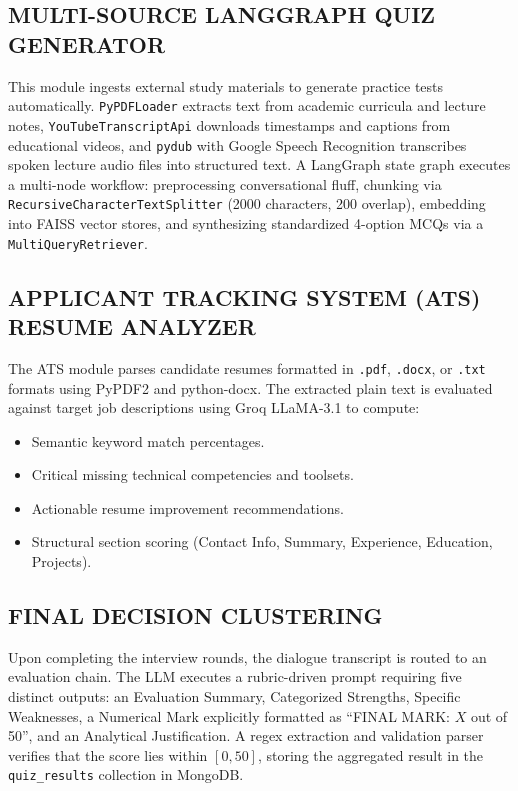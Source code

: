 \documentclass[12pt,a4paper]{report}
\begin{document}
\subsection{MULTI-SOURCE LANGGRAPH QUIZ GENERATOR}

This module ingests external study materials to generate practice tests automatically.
\texttt{PyPDFLoader} extracts text from academic curricula and lecture notes,
\texttt{YouTubeTranscriptApi} downloads timestamps and captions from educational
videos, and \texttt{pydub} with Google Speech Recognition transcribes spoken lecture
audio files into structured text. A LangGraph state graph executes a multi-node workflow:
preprocessing conversational fluff, chunking via \texttt{RecursiveCharacterTextSplitter}
(2000 characters, 200 overlap), embedding into FAISS vector stores, and synthesizing
standardized 4-option MCQs via a \texttt{MultiQueryRetriever}.

\subsection{APPLICANT TRACKING SYSTEM (ATS) RESUME ANALYZER}

The ATS module parses candidate resumes formatted in \texttt{.pdf}, \texttt{.docx}, or
\texttt{.txt} formats using PyPDF2 and python-docx. The extracted plain text is evaluated
against target job descriptions using Groq LLaMA-3.1 to compute:
\begin{itemize}[noitemsep]
  \item Semantic keyword match percentages.
  \item Critical missing technical competencies and toolsets.
  \item Actionable resume improvement recommendations.
  \item Structural section scoring (Contact Info, Summary, Experience, Education, Projects).
\end{itemize}

\subsection{FINAL DECISION CLUSTERING}

Upon completing the interview rounds, the dialogue transcript is routed to an evaluation
chain. The LLM executes a rubric-driven prompt requiring five distinct outputs: an
Evaluation Summary, Categorized Strengths, Specific Weaknesses, a Numerical Mark
explicitly formatted as ``FINAL MARK: $X$ out of 50'', and an Analytical Justification. A
regex extraction and validation parser verifies that the score lies within $[0, 50]$, storing
the aggregated result in the \texttt{quiz\_results} collection in MongoDB.
\end{document}
